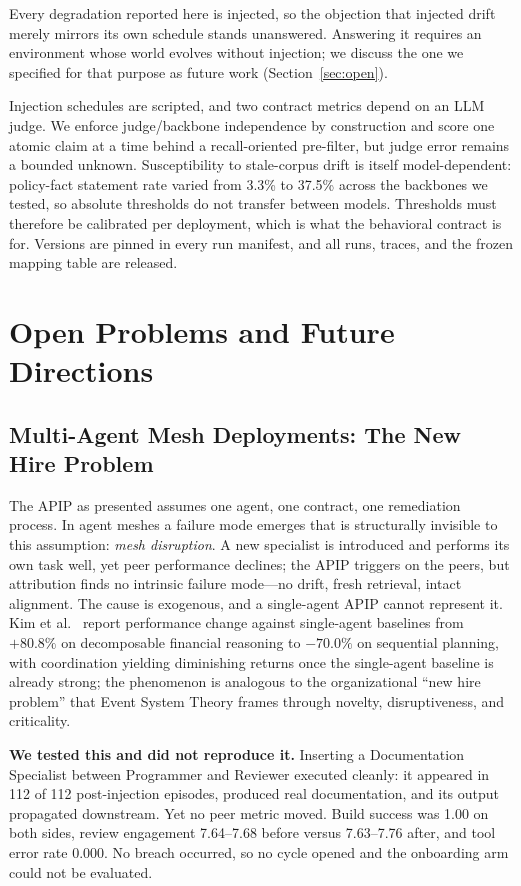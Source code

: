 \documentclass[conference]{IEEEtran}
\begin{document}
Every degradation reported here is injected, so the objection that injected
drift merely mirrors its own schedule stands unanswered. Answering it requires
an environment whose world evolves without injection; we discuss the one we
specified for that purpose as future work (Section~\ref{sec:open}).

Injection schedules are scripted, and two contract metrics depend on an LLM
judge. We enforce judge/backbone independence by construction and score one
atomic claim at a time behind a recall-oriented pre-filter, but judge error
remains a bounded unknown. Susceptibility to stale-corpus drift is itself
model-dependent: policy-fact statement rate varied from 3.3\% to 37.5\% across
the backbones we tested, so absolute thresholds do not transfer between models.
Thresholds must therefore be calibrated per deployment, which is what the
behavioral contract is for. Versions are pinned in every run manifest, and all
runs, traces, and the frozen mapping table are released.

\section{Open Problems and Future Directions}

\subsection{Multi-Agent Mesh Deployments: The New Hire Problem}
\label{sec:mesh}

The APIP as presented assumes one agent, one contract, one remediation
process. In agent meshes a failure mode emerges that is structurally invisible
to this assumption: \emph{mesh disruption}. A new specialist is introduced and
performs its own task well, yet peer performance declines; the APIP triggers on
the peers, but attribution finds no intrinsic failure mode---no drift, fresh
retrieval, intact alignment. The cause is exogenous, and a single-agent APIP
cannot represent it. Kim et al.\ \cite{kim2025} report performance change
against single-agent baselines from $+80.8\%$ on decomposable financial
reasoning to $-70.0\%$ on sequential planning, with coordination yielding
diminishing returns once the single-agent baseline is already strong; the
phenomenon is analogous to the
organizational ``new hire problem'' that Event System Theory
\cite{morgeson2015} frames through novelty, disruptiveness, and criticality.

\textbf{We tested this and did not reproduce it.} Inserting a Documentation
Specialist between Programmer and Reviewer executed cleanly: it appeared in
112 of 112 post-injection episodes, produced real documentation, and its output
propagated downstream. Yet no peer metric moved. Build success was 1.00 on both
sides, review engagement 7.64--7.68 before versus 7.63--7.76 after, and tool
error rate 0.000. No breach occurred, so no cycle opened and the onboarding arm
could not be evaluated.
\end{document}
